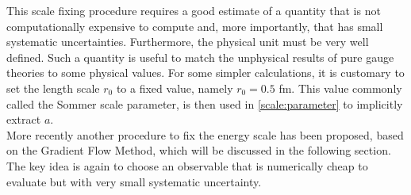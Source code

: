 This scale fixing procedure requires a good estimate of a quantity that is not computationally expensive to compute and, more importantly, that has small systematic uncertainties. Furthermore, the physical unit must be very well defined. Such a quantity is useful to match the unphysical results of pure gauge theories to some physical values. For some simpler calculations, it is customary to set the length scale $r_0$ to a fixed value, namely $r_0 = 0.5$ fm. This value commonly called the Sommer scale parameter, is then used in \cref{scale:parameter} to implicitly extract $a$. \\
More recently another procedure to fix the energy scale has been proposed, based on the Gradient Flow Method, which will be discussed in the following section. The key idea is again to choose an observable that is numerically cheap to evaluate but with very small systematic uncertainty.

